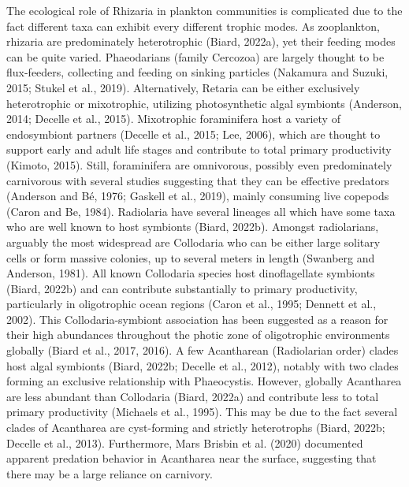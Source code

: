 \documentclass[
]{article}
\begin{document}
The ecological role of Rhizaria in plankton communities is complicated
due to the fact different taxa can exhibit every different trophic
modes. As zooplankton, rhizaria are predominately heterotrophic (Biard,
2022a), yet their feeding modes can be quite varied. Phaeodarians
(family Cercozoa) are largely thought to be flux-feeders, collecting and
feeding on sinking particles (Nakamura and Suzuki, 2015; Stukel et al.,
2019). Alternatively, Retaria can be either exclusively heterotrophic or
mixotrophic, utilizing photosynthetic algal symbionts (Anderson, 2014;
Decelle et al., 2015). Mixotrophic foraminifera host a variety of
endosymbiont partners (Decelle et al., 2015; Lee, 2006), which are
thought to support early and adult life stages and contribute to total
primary productivity (Kimoto, 2015). Still, foraminifera are omnivorous,
possibly even predominately carnivorous with several studies suggesting
that they can be effective predators (Anderson and Bé, 1976; Gaskell et
al., 2019), mainly consuming live copepods (Caron and Be, 1984).
Radiolaria have several lineages all which have some taxa who are well
known to host symbionts (Biard, 2022b). Amongst radiolarians, arguably
the most widespread are Collodaria who can be either large solitary
cells or form massive colonies, up to several meters in length (Swanberg
and Anderson, 1981). All known Collodaria species host dinoflagellate
symbionts (Biard, 2022b) and can contribute substantially to primary
productivity, particularly in oligotrophic ocean regions (Caron et al.,
1995; Dennett et al., 2002). This Collodaria-symbiont association has
been suggested as a reason for their high abundances throughout the
photic zone of oligotrophic environments globally (Biard et al., 2017,
2016). A few Acantharean (Radiolarian order) clades host algal symbionts
(Biard, 2022b; Decelle et al., 2012), notably with two clades forming an
exclusive relationship with Phaeocystis. However, globally Acantharea
are less abundant than Collodaria (Biard, 2022a) and contribute less to
total primary productivity (Michaels et al., 1995). This may be due to
the fact several clades of Acantharea are cyst-forming and strictly
heterotrophs (Biard, 2022b; Decelle et al., 2013). Furthermore, Mars
Brisbin et al. (2020) documented apparent predation behavior in
Acantharea near the surface, suggesting that there may be a large
reliance on carnivory.
\end{document}
